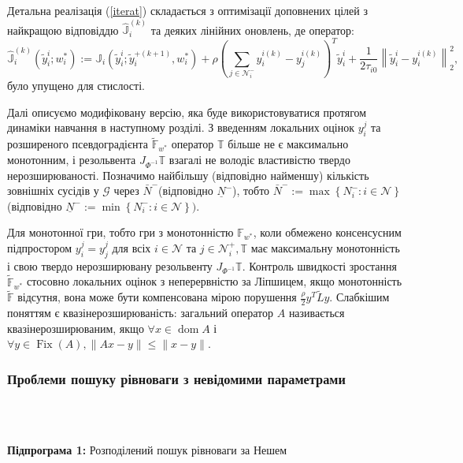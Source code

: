 \documentclass[a4paper]{article}
\begin{document}
Детальна реалізація (\ref{iterat}) складається з оптимізації доповнених цілей з найкращою відповіддю $\hat{\mathbb{J}}_{i}^{(k)}$ та деяких лінійних оновлень, де оператор: $$\hat{\mathbb{J}}_{i}^{(k)}\left(\tilde{y}_{i}^{i}; w_{i}^{*}\right) := \mathbb{J }_{i}(\tilde{y}_{i}^{i}; \tilde{y}_{i}^{+(k+1)}, w_{i}^{*}) + \rho(\sum_{j \in \mathcal{N}_{i}^{-}} y_{i}^{i(k)} - y_{ j}^{i(k)})^{T} \tilde{y}_{i}^{i} + \frac{1}{2 \tau_{i 0}}\left\|\tilde {y}_{i}^{i}-y_{i}^{i(k)}\right\|_{2}^{2},$$ було упущено для стислості.

Далі описуємо модифіковану версію, яка буде використовуватися протягом динаміки навчання в наступному розділі. З введенням локальних оцінок $y_{i}^{j}$ та розширеного псевдоградієнта $\tilde{\mathbb{F}}_{w^{*}}$ оператор $\mathbb{T}$ більше не є максимально монотонним, і резольвента $J_{\Phi^{-1}} \mathbb{T}$ взагалі не володіє властивістю твердо нерозширюваності. Позначимо найбільшу (відповідно найменшу) кількість зовнішніх сусідів у $\mathcal{G}$ через $\bar{N}^{-}$(відповідно $\underline{N}^{-}$), тобто $\bar{N}^{-}:=\max \left\{N_{i}^{-}: i \in \mathcal{N}\right\}$ (відповідно $\underline{N} ^{-}:=\min \left\{N_{i}^{-}: i \in \mathcal{N}\right\})$.

Для монотонної гри, тобто гри з монотонністю $\mathbb{F}_{w^{*}}$, коли обмежено консенсусним підпростором $y_{i}^{j}=y_{j} ^{j}$ для всіх $i \in \mathcal{N}$ та $j \in \mathcal{N}_{i}^{+}, \mathbb{T}$ має максимальну монотонність і свою твердо нерозширювану резольвенту $J_{\Phi^{-1}} \mathbb{T}$. Контроль швидкості зростання $\tilde{\mathbb{F}}_{w^{*}}$ стосовно локальних оцінок з неперервністю за  Ліпшицем, якщо монотонність $\tilde{\mathbb{F}}$ відсутня, вона може бути компенсована мірою порушення $\frac{\rho}{2} y^{T} \tilde{L} y$. Слабкішим поняттям є квазінерозширюваність: загальний оператор $A$ називається квазінерозширюваним, якщо $\forall x \in \operatorname{dom} A$ і $\forall y \in \operatorname{Fix}(A) ,\|A x-y\| \leq\|x-y\|$.

\clearpage
\subsubsection{Проблеми пошуку рівноваги з невідомими параметрами\label{subr}}

\hline\\\

\textbf{Підпрограма 1:} Розподілений пошук рівноваги за Нешем\\

\hline\\\
\end{document}
